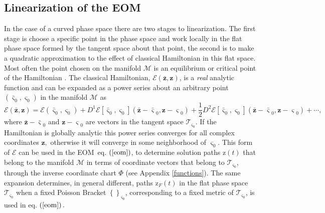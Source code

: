\documentclass[aps,preprint]{revtex4}%
\begin{document}
\subsection{Linearization of the EOM}

In the case of a curved phase space there are two stages to linearization. The
first stage is choose a specific point in the phase space and work locally in
the flat phase space formed by the tangent space about that point, the second
is to make a quadratic approximation to the effect of classical Hamiltonian in
this flat space. Most often the point chosen on the manifold $\mathcal{M}$ is
an equilibrium or critical point of the Hamiltonian \cite{Arnold}. The
classical Hamiltonian, $\mathcal{E}\left(  \mathbf{\bar{z}},\mathbf{z}\right)
$, is a \emph{real} analytic function and can be expanded as a power series
about an arbitrary point $\left(  \mathbf{\bar{\varsigma}}_{0}%
,\mathbf{\varsigma}_{0}\right)  $ in the manifold $\mathcal{M}$ as
\begin{equation}
\mathcal{E}\left(  \mathbf{\bar{z}},\mathbf{z}\right)  =\mathcal{E}\left(
\mathbf{\bar{\varsigma}}_{0},\mathbf{\varsigma}_{0}\right)  +D^{1}%
\mathcal{E}\left[  \mathbf{\bar{\varsigma}}_{0},\mathbf{\varsigma}_{0}\right]
\left(  \mathbf{\bar{z}-\bar{\varsigma}}_{0},\mathbf{z-\varsigma}_{0}\right)
+\frac{1}{2}D^{2}\mathcal{E}\left[  \mathbf{\bar{\varsigma}}_{0}%
,\mathbf{\varsigma}_{0}\right]  \left(  \mathbf{\bar{z}-\bar{\varsigma}}%
_{0},\mathbf{z-\varsigma}_{0}\right)  +\cdots, \label{enexp}%
\end{equation}
where $\mathbf{\bar{z}-\bar{\varsigma}}_{0}$ and $\mathbf{z-\varsigma}_{0}$
are vectors in the tangent space $\mathcal{T}_{\mathbf{\varsigma}_{0}}$. If
the Hamiltonian is globally analytic this power series converges for all
complex coordinates $\mathbf{z,}$ otherwise it will converge in some
neighborhood of $\mathbf{\varsigma}_{0}.$ This form of $\mathcal{E}$ can be
used in the EOM\ eq. $\left(  \ref{eom}\right)  $, to determine solution paths
\textrm{z}$\left(  t\right)  $ that belong to the manifold $\mathcal{M}$ in
terms of coordinate vectors that belong to $\mathcal{T}_{\mathbf{\varsigma
}_{0}}$, through the inverse coordinate chart $\Phi$ (see Appendix
\ref{functions}). The same expansion determines, in general different, paths
\textrm{z}$_{F}\left(  t\right)  $ in the flat phase space $\mathcal{T}%
_{\mathbf{\varsigma}_{0}}$ when a fixed Poisson Bracket $\left\{  {}\right\}
_{\mathbf{\varsigma}_{0}}$, corresponding to a fixed metric of $\mathcal{T}%
_{\mathbf{\varsigma}_{0}}$, is used in eq. $\left(  \ref{eom}\right)  .$
\end{document}
